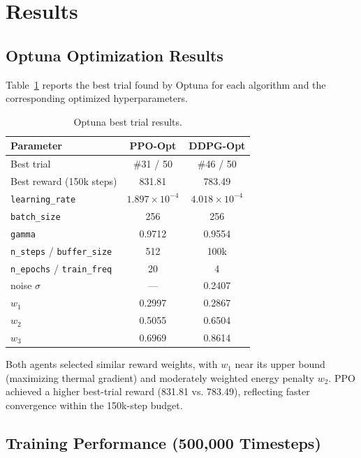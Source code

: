 \documentclass[journal,10pt,twocolumn]{IEEEtran}
\begin{document}
\section{Results}
\label{sec:results}

\subsection{Optuna Optimization Results}
\label{ssec:optuna_results}

Table~\ref{tab:optuna_best} reports the best trial found by Optuna for each algorithm and the corresponding optimized hyperparameters.

\begin{table}[h]
  \centering
  \caption{Optuna best trial results.}
  \label{tab:optuna_best}
  \begin{tabular}{lcc}
    \toprule
    Parameter & PPO-Opt & DDPG-Opt \\
    \midrule
    Best trial & \#31 / 50 & \#46 / 50 \\
    Best reward (150k steps) & 831.81 & 783.49 \\
    \texttt{learning\_rate}  & $1.897\times10^{-4}$ & $4.018\times10^{-4}$ \\
    \texttt{batch\_size}     & 256 & 256 \\
    \texttt{gamma}           & 0.9712 & 0.9554 \\
    \texttt{n\_steps} / \texttt{buffer\_size} & 512 & 100k \\
    \texttt{n\_epochs} / \texttt{train\_freq} & 20 & 4 \\
    noise $\sigma$           & --- & 0.2407 \\
    $w_1$                    & 0.2997 & 0.2867 \\
    $w_2$                    & 0.5055 & 0.6504 \\
    $w_3$                    & 0.6969 & 0.8614 \\
    \bottomrule
  \end{tabular}
\end{table}

Both agents selected similar reward weights, with $w_1$ near its upper bound (maximizing thermal gradient) and moderately weighted energy penalty $w_2$. PPO achieved a higher best-trial reward (831.81 vs. 783.49), reflecting faster convergence within the 150k-step budget.

\subsection{Training Performance (500,000 Timesteps)}
\label{ssec:training}
\end{document}
